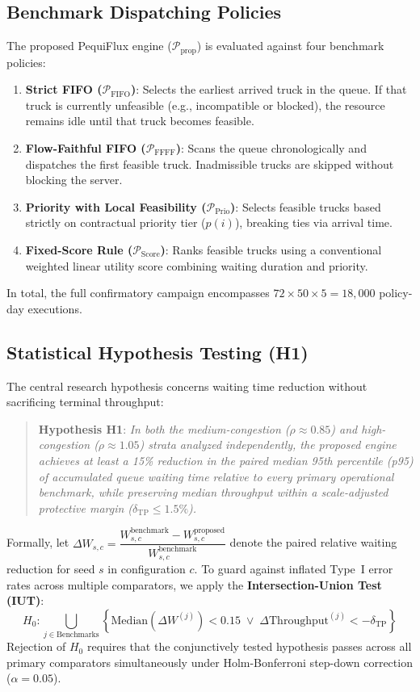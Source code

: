 \documentclass[11pt,a4paper]{article}
\begin{document}
\subsection{Benchmark Dispatching Policies}
The proposed PequiFlux engine ($\mathcal{P}_{\text{prop}}$) is evaluated against four benchmark policies:
\begin{enumerate}[leftmargin=1.2cm,itemsep=0pt,topsep=2pt]
  \item \textbf{Strict FIFO ($\mathcal{P}_{\text{FIFO}}$)}: Selects the earliest arrived truck in the queue. If that truck is currently unfeasible (e.g., incompatible or blocked), the resource remains idle until that truck becomes feasible.
  \item \textbf{Flow-Faithful FIFO ($\mathcal{P}_{\text{FFFF}}$)}: Scans the queue chronologically and dispatches the first feasible truck. Inadmissible trucks are skipped without blocking the server.
  \item \textbf{Priority with Local Feasibility ($\mathcal{P}_{\text{Prio}}$)}: Selects feasible trucks based strictly on contractual priority tier ($p(i)$), breaking ties via arrival time.
  \item \textbf{Fixed-Score Rule ($\mathcal{P}_{\text{Score}}$)}: Ranks feasible trucks using a conventional weighted linear utility score combining waiting duration and priority.
\end{enumerate}

In total, the full confirmatory campaign encompasses $72 \times 50 \times 5 = 18{,}000$ policy-day executions.

\subsection{Statistical Hypothesis Testing (H1)}
The central research hypothesis concerns waiting time reduction without sacrificing terminal throughput:
\begin{quote}
\textbf{Hypothesis H1}: \emph{In both the medium-congestion ($\rho \approx 0.85$) and high-congestion ($\rho \approx 1.05$) strata analyzed independently, the proposed engine achieves at least a 15\% reduction in the paired median 95th percentile (p95) of accumulated queue waiting time relative to every primary operational benchmark, while preserving median throughput within a scale-adjusted protective margin ($\delta_{\mathrm{TP}} \le 1.5\%$).}
\end{quote}

Formally, let $\Delta W_{s,c} = \dfrac{W^{\text{benchmark}}_{s,c} - W^{\text{proposed}}_{s,c}}{W^{\text{benchmark}}_{s,c}}$ denote the paired relative waiting reduction for seed $s$ in configuration $c$. To guard against inflated Type~I error rates across multiple comparators, we apply the \textbf{Intersection-Union Test (IUT)}:
\begin{equation}
  H_0: \bigcup_{j \in \text{Benchmarks}} \left\{ \mathrm{Median}(\Delta W^{(j)}) < 0.15 \;\lor\; \Delta \mathrm{Throughput}^{(j)} < -\delta_{\mathrm{TP}} \right\}
\end{equation}
Rejection of $H_0$ requires that the conjunctively tested hypothesis passes across all primary comparators simultaneously under Holm-Bonferroni step-down correction ($\alpha = 0.05$).
\end{document}
